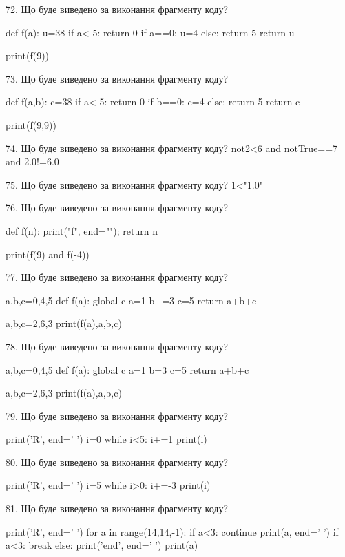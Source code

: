 \documentclass[11pt]{article}
\begin{document}
72. Що буде виведено за виконання фрагменту коду?

def f(a):
    u=38
    if a<-5: 
        return 0
    if a==0:
         u=4
    else:
         return 5
    return u

print(f(9))


73. Що буде виведено за виконання фрагменту коду?

def f(a,b):
    c=38
    if a<-5:
        return 0
    if b==0:
         c=4
    else: 
        return 5
    return c

print(f(9,9))

74. Що буде виведено за виконання фрагменту коду?
not2<6 and notTrue==7 and 2.0!=6.0

75. Що буде виведено за виконання фрагменту коду?
1<"1.0"

76. Що буде виведено за виконання фрагменту коду?

def f(n):
    print("f", end="");
    return n

print(f(9) and f(-4))


77. Що буде виведено за виконання фрагменту коду?

a,b,c=0,4,5
def f(a):
global c    a=1
    b+=3
    c=5
    return a+b+c

a,b,c=2,6,3
print(f(a),a,b,c)


78. Що буде виведено за виконання фрагменту коду?

a,b,c=0,4,5
def f(a):
global c    a=1
    b=3
    c=5
    return a+b+c

a,b,c=2,6,3
print(f(a),a,b,c)


79. Що буде виведено за виконання фрагменту коду?

print('R', end=' ')
i=0
while i<5:
    i+=1
print(i)



80. Що буде виведено за виконання фрагменту коду?

print('R', end=' ')
i=5
while i>0:
    i+=-3
print(i)



81. Що буде виведено за виконання фрагменту коду?

print('R', end=' ')
for a in range(14,14,-1):
    if a<3:
        continue
        print(a, end=' ')
    if a<3:
        break
    else:
        print('end', end=' ')
    print(a)
\end{document}
